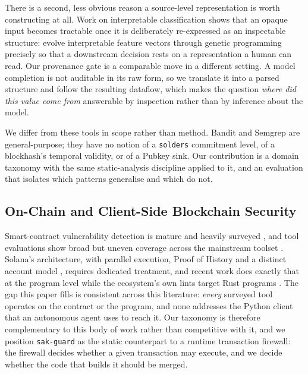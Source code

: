 There is a second, less obvious reason a source-level representation is worth
constructing at all. Work on interpretable classification shows that an opaque
input becomes tractable once it is deliberately re-expressed as an inspectable
structure: \cite{ulain2024featureselection} evolve interpretable feature vectors
through genetic programming precisely so that a downstream decision rests on a
representation a human can read. Our provenance gate is a comparable move in a
different setting. A model completion is not auditable in its raw form, so we
translate it into a parsed structure and follow the resulting dataflow, which
makes the question \emph{where did this value come from} answerable by
inspection rather than by inference about the model.

We differ from these tools in scope rather than method. Bandit and Semgrep are
general-purpose; they have no notion of a \texttt{solders} commitment level, of
a blockhash's temporal validity, or of a Pubkey sink. Our contribution is a
domain taxonomy with the same static-analysis discipline applied to it, and an
evaluation that isolates which patterns generalise and which do not.

\subsection{On-Chain and Client-Side Blockchain Security}

Smart-contract vulnerability detection is mature and heavily surveyed
\cite{khan2024survey,venkatraman2026defi,yang2024sokai}, and tool evaluations
show broad but uneven coverage across the mainstream toolset
\cite{wang2023evaluation,tantikul2020exploring}. Solana's architecture, with
parallel execution, Proof of History and a distinct account model
\cite{yakovenko2018solana,wijaya2025ethereum}, requires dedicated treatment,
and recent work does exactly that at the program level \cite{zhao2025soleker}
while the ecosystem's own lints target Rust programs \cite{tob2024solanalints}.
The gap this paper fills is consistent across this literature: \emph{every}
surveyed tool operates on the contract or the program, and none addresses the
Python client that an autonomous agent uses to reach it. Our taxonomy is
therefore complementary to this body of work rather than competitive with it,
and we position \texttt{sak-guard} as the static counterpart to a runtime
transaction firewall: the firewall decides whether a given transaction may
execute, and we decide whether the code that builds it should be merged.

